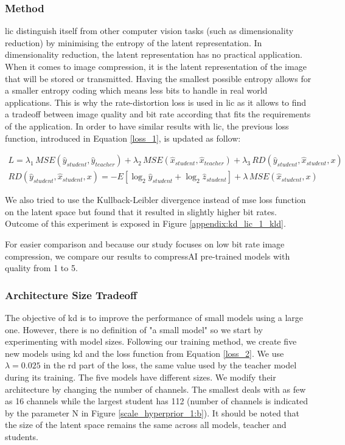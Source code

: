 \subsubsection{Method}
\acrshort{lic} distinguish itself from other computer vision tasks (such as dimensionality reduction) by minimising the entropy of the latent representation. In dimensionality reduction, the latent representation has no practical application. When it comes to image compression, it is the latent representation of the image that will be stored or transmitted. Having the smallest possible entropy allows for a smaller entropy coding which means less bits to handle in real world applications. This is why the rate-distortion loss is used in \acrshort{lic} as it allows to find a tradeoff between image quality and bit rate according that fits the requirements of the application. In order to have similar results with \acrshort{lic}, the previous loss function, introduced in Equation \eqref{loss_1}, is updated as follow:

\begin{align}
    L = \lambda_{1}\, MSE(\hat{y}_{student}, \hat{y}_{teacher}) + \lambda_{2}\, MSE(\hat{x}_{student}, \hat{x}_{teacher}) + \lambda_{3}\, RD(\hat{y}_{student}, \hat{x}_{student}, x)\label{loss_2}\\
    RD(\hat{y}_{student}, \hat{x}_{student}, x) = -E[\log_{2}\hat{y}_{student} + \log_{2}\hat{z}_{student}] + \lambda\, MSE(\hat{x}_{student}, x)
\end{align}

We also tried to use the Kullback-Leibler divergence instead of \acrshort{mse} loss function on the latent space but found that it resulted in slightly higher bit rates. Outcome of this experiment is exposed in Figure \ref{appendix:kd_lic_1_kld}.

For easier comparison and because our study focuses on low bit rate image compression, we compare our results to compressAI pre-trained models with \textsf{quality} from 1 to 5.

\subsubsection{Architecture Size Tradeoff}
\label{architecture_size_tradeoff}
The objective of \acrshort{kd} is to improve the performance of small models using a large one. However, there is no definition of "a small model" so we start by experimenting with model sizes. Following our training method, we create five new models using \acrshort{kd} and the loss function from Equation \ref{loss_2}. We use \(\lambda = 0.025\) in the \acrshort{rd} part of the loss, the same value used by the teacher model during its training. The five models have different sizes. We modify their architecture by changing the number of channels. The smallest deals with as few as 16 channels while the largest student has 112 (number of channels is indicated by the parameter N in Figure \ref{scale_hyperprior_1:b}). It should be noted that the size of the latent space remains the same across all models, teacher and students.

